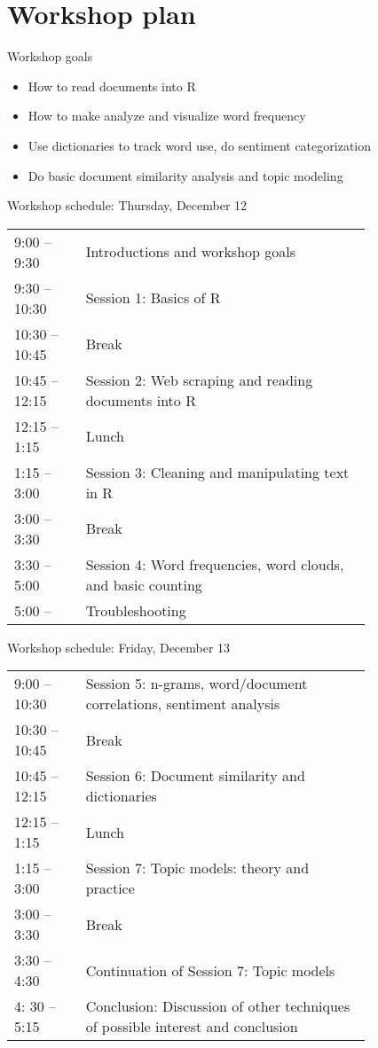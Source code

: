 \documentclass[t]{beamer}
\begin{document}
\section{Workshop plan}
\begin{frame}{Workshop goals}
    \begin{itemize}
        \item How to read documents into R
        \item How to make analyze and visualize word frequency
        \item Use dictionaries to track word use, do sentiment categorization
        \item Do basic document similarity analysis and topic modeling
    \end{itemize}
\end{frame}

\begin{frame}{Workshop schedule: Thursday, December 12}
\begin{tabular}{l p{0.8\linewidth}}
9:00 – 9:30		&       Introductions and workshop goals \\
9:30 – 10:30	&	    Session 1: Basics of R \\
10:30 – 10:45 	&	    Break \\
10:45 – 12:15	&	    Session 2: Web scraping and reading documents into R  \\
12:15 – 1:15	&	    Lunch  \\
1:15 – 3:00		&       Session 3: Cleaning and manipulating text in R \\
3:00 – 3:30		&       Break \\
3:30 – 5:00	    &	    Session 4: Word frequencies, word clouds, and basic counting \\
5:00 -- 		&       Troubleshooting \\
\end{tabular}
\end{frame}

\begin{frame}{Workshop schedule: Friday, December 13}
\begin{tabular}{l p{0.8\linewidth}}
9:00 – 10:30	&	Session 5: n-grams, word/document correlations, sentiment analysis \\
10:30 – 10:45 	&	Break \\
10:45 – 12:15	&	Session 6: Document similarity and dictionaries \\
12:15 – 1:15	&	Lunch \\
1:15 – 3:00		 &   Session 7: Topic models: theory and practice \\
3:00 – 3:30		  &  Break \\
3:30 – 4:30		   & Continuation of Session 7: Topic models \\
4: 30 – 5:15		&Conclusion: Discussion of other techniques of possible interest and conclusion \\
\end{tabular}
\end{frame}

\begin{frame}[allowframebreaks]
\printbibliography
\end{frame}
\end{document}
